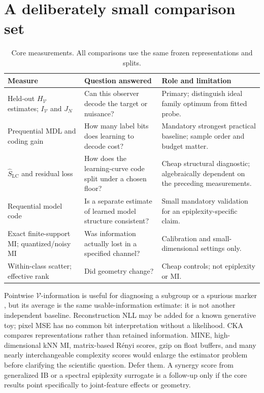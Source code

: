 \documentclass[11pt,a4paper]{article}
\newcommand{\V}{\mathcal V}
\begin{document}
\section{A deliberately small comparison set}
\begin{table}[htbp]
\small
\begin{tabularx}{\linewidth}{@{}>{\raggedright\arraybackslash}p{3.1cm}LL@{}}
\toprule
Measure & Question answered & Role and limitation\\
\midrule
Held-out $H_{\V}$ estimates; $I_{\V}$ and $J_N$ & Can this observer decode the target or nuisance? & Primary; distinguish ideal family optimum from fitted probe.\\
Prequential MDL and coding gain & How many label bits does learning to decode cost? & Mandatory strongest practical baseline; sample order and budget matter.\\
$\widehat S_{\mathrm{LC}}$ and residual loss & How does the learning-curve code split under a chosen floor? & Cheap structural diagnostic; algebraically dependent on the preceding measurements.\\
Requential model code & Is a separate estimate of learned model structure consistent? & Small mandatory validation for an epiplexity-specific claim.\\
Exact finite-support MI; quantized/noisy MI & Was information actually lost in a specified channel? & Calibration and small-dimensional settings only.\\
Within-class scatter; effective rank & Did geometry change? & Cheap controls; not epiplexity or MI.\\
\bottomrule
\end{tabularx}
\caption{Core measurements. All comparisons use the same frozen representations and splits.}
\end{table}

Pointwise $\V$-information is useful for diagnosing a subgroup or a spurious marker \citep{ethayarajh2022}, but its average is the same usable-information estimate: it is not another independent baseline. Reconstruction NLL may be added for a known generative toy; pixel MSE has no common bit interpretation without a likelihood. CKA compares representations rather than retained information. MINE, high-dimensional kNN MI, matrix-based R\'enyi scores, gzip on float buffers, and many nearly interchangeable complexity scores would enlarge the estimator problem before clarifying the scientific question. Defer them. A synergy score from generalized IB or a spectral epiplexity surrogate is a follow-up only if the core results point specifically to joint-feature effects or geometry.
\end{document}
